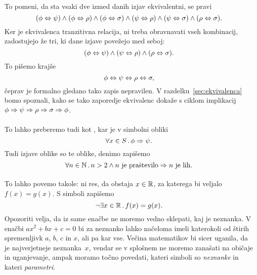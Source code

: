 \paragraph{}
%
To pomeni, da sta vsaki dve izmed danih izjav ekvivalentni, se pravi
%
\begin{equation*}
  (\phi \Leftrightarrow \psi) \land (\phi \Leftrightarrow \rho) \land (\phi \Leftrightarrow \sigma) \land (\psi \Leftrightarrow \rho)
  \land (\psi \Leftrightarrow \sigma) \land (\rho \Leftrightarrow \sigma).
\end{equation*}
%
Ker je ekvivalenca tranzitivna relacija, ni treba obravnavati vseh
kombinacij, zadostujejo že tri, ki dane izjave povežejo med seboj:
%
\begin{equation*}
  (\phi \Leftrightarrow \psi) \land (\psi \Leftrightarrow \rho) \land (\rho \Leftrightarrow \sigma).
\end{equation*}
%
To pišemo krajše
%
\begin{equation*}
  \phi \Leftrightarrow \psi \Leftrightarrow \rho \Leftrightarrow \sigma,
\end{equation*}
%
čeprav je formalno gledano tako zapis nepravilen. V
razdelku~\ref{sec:ekvivalenca} bomo spoznali, kako se tako zaporedje
ekvivalenc dokaže s ciklom implikacij $\phi \Rightarrow \psi \Rightarrow \rho
\Rightarrow \sigma \Rightarrow \phi$.

\paragraph{}
%
To lahko preberemo tudi kot , kar je v simbolni obliki
%
\begin{equation*}
  \forall x \in S \,.\, \phi \Rightarrow \psi.
\end{equation*}
%
Tudi izjave oblike  so te oblike, denimo  zapišemo
%
\begin{equation*}
  \forall n \in \mathbb{N} \,.\, n > 2 \land \text{$n$ je praštevilo} \Rightarrow \text{$n$ je lih}.
\end{equation*}

\paragraph{}
%
To lahko povemo takole: ni res, da obstaja $x \in \mathbb{R}$, za katerega bi
veljalo $f(x) = g(x)$. S simboli zapišemo
%
\begin{equation*}
  \lnot \exists x \in \mathbb{R} \,.\, f(x) = g(x).
\end{equation*}
%
Opozoriti velja, da iz same enačbe ne moremo vedno sklepati, kaj je
neznanka. V enačbi $a x^2 + b x + c = 0$ bi za neznanko lahko načeloma
imeli katerokoli od štirih spremenljivk $a$, $b$, $c$ in $x$, ali pa
kar vse. Večina matematikov bi sicer uganila, da je najverjetneje
neznanka~$x$, vendar se v splošnem ne moremo zanašati na običaje in
uganjevanje, ampak moramo točno povedati, kateri simboli so
\emph{neznanke} in kateri \emph{parametri}.


